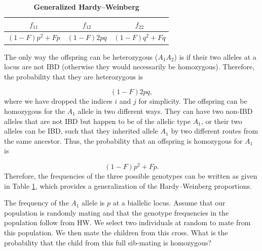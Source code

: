 {{\begin{table}
\begin{center}
\begin{tabular}{ccc}
\hline
$f_{11}$ & $f_{12}$ & $f_{22}$ \\
\hline
$(1-F) p^2 + F p$ & $(1-F) 2pq$ & $(1-F) q^2 + F q$ \\
\hline
\end{tabular}
\end{center}
\caption{\textbf{Generalized Hardy--Weinberg}} \label{table:GeneralizedHWE}
\end{table}

The only way the offspring can be heterozygous ($A_1 A_2$) is if their two
alleles at a locus are not IBD (otherwise they would necessarily be
homozygous). Therefore, the probability that they are heterozygous is

\begin{equation}
(1-F) 2p q,
\label{eq:hetGenHW}
\end{equation}
%
where we have dropped the indices $i$ and $j$ for simplicity.  The offspring
can be homozygous for the $A_1$ allele in two different ways.  They can have
two non-IBD alleles that are not IBD but happen to be of the allelic type
$A_1$, or their two alleles can be IBD, such that they inherited allele $A_1$
by two different routes from the same ancestor. Thus, the probability that an
offspring is homozygous for $A_1$ is

\begin{equation}
(1-F) p^2 + F p.
\end{equation}
%
Therefore, the frequencies of the three possible genotypes can be written as given in
Table \ref{table:GeneralizedHWE}, which provides a generalization of the Hardy--Weinberg
proportions.\\



\begin{question}
The frequency of the $A_1$ allele is $p$ at a biallelic locus. Assume that our population is randomly mating and that the
genotype frequencies in the population follow from HW. We select two
individuals at random to mate from this population. We then mate the children
from this cross. What is the probability that the child from this full
sib-mating is
homozygous?
\end{question}

}}
